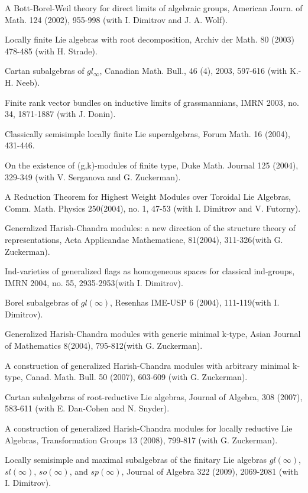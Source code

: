 \myss \label{31.} A Bott-Borel-Weil theory for direct limits of
algebraic groups, American Journ. of Math.  124 (2002), 955-998
(with I. Dimitrov and J. A. Wolf).

\myss \label{32.} Locally finite Lie algebras with root
decomposition, Archiv der Math. 80 (2003) 478-485 (with H.
Strade).

\myss \label{33.} Cartan subalgebras of $gl_{\infty}$, Canadian Math.
Bull., 46 (4), 2003, 597-616 (with K.-H. Neeb).

\myss \label{34.} Finite rank vector bundles on inductive limits of
grassmannians, IMRN 2003, no. 34, 1871-1887  (with J. Donin).

\myss \label{35.} Classically semisimple locally finite Lie
superalgebras, Forum Math. 16 (2004), 431-446.

\myss \label{36.} On the existence of (g,k)-modules of finite
type, Duke Math. Journal 125 (2004), 329-349
(with V. Serganova and G. Zuckerman).

\myss \label{37.} A Reduction Theorem for Highest Weight Modules
over Toroidal Lie Algebras, Comm. Math. Physics 250(2004), no. 1, 47-53 (with I. Dimitrov and V. Futorny).

\myss \label{38.} Generalized Harish-Chandra modules: a new direction of
the structure theory of representations, Acta Applicandae Mathematicae,
81(2004), 311-326(with G. Zuckerman).

\myss \label{39.} Ind-varieties of generalized flags as homogeneous
spaces for classical ind-groups, IMRN 2004, no. 55, 2935-2953(with I. Dimitrov).

\myss \label{40.} Borel subalgebras of $gl(\infty)$, Resenhas IME-USP 6 (2004), 111-119(with I. Dimitrov).

\myss \label{41.} Generalized Harish-Chandra modules with generic minimal k-type,
Asian Journal of Mathematics 8(2004), 795-812(with G. Zuckerman).

\myss \label{42.} A construction of generalized Harish-Chandra modules with arbitrary minimal k-type, Canad. Math. Bull. 50 (2007), 603-609 (with G. Zuckerman). 

\myss \label{43.} Cartan subalgebras of root-reductive Lie algebras, Journal of Algebra, 308 (2007), 583-611 (with E. Dan-Cohen and N. Snyder).

\myss \label{44.} A construction of generalized Harish-Chandra modules for locally reductive Lie Algebras, Transformation Groups 13 (2008), 799-817 (with G. Zuckerman).

\myss \label{45.} Locally semisimple and maximal subalgebras of the finitary Lie algebras $gl(\infty)$, $sl(\infty)$, $so(\infty)$, and $sp(\infty)$, Journal of Algebra 322 (2009), 2069-2081 (with I. Dimitrov).

